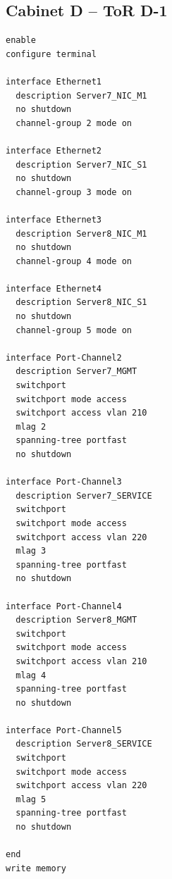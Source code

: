 \subsection{Cabinet D -- ToR D-1}
\begin{lstlisting}[caption={ToR D-1: downlinks to Servers 7 and 8 (DMZ).},basicstyle=\ttfamily\footnotesize,breaklines=true]
enable
configure terminal

interface Ethernet1
  description Server7_NIC_M1
  no shutdown
  channel-group 2 mode on

interface Ethernet2
  description Server7_NIC_S1
  no shutdown
  channel-group 3 mode on

interface Ethernet3
  description Server8_NIC_M1
  no shutdown
  channel-group 4 mode on

interface Ethernet4
  description Server8_NIC_S1
  no shutdown
  channel-group 5 mode on

interface Port-Channel2
  description Server7_MGMT
  switchport
  switchport mode access
  switchport access vlan 210
  mlag 2
  spanning-tree portfast
  no shutdown

interface Port-Channel3
  description Server7_SERVICE
  switchport
  switchport mode access
  switchport access vlan 220
  mlag 3
  spanning-tree portfast
  no shutdown

interface Port-Channel4
  description Server8_MGMT
  switchport
  switchport mode access
  switchport access vlan 210
  mlag 4
  spanning-tree portfast
  no shutdown

interface Port-Channel5
  description Server8_SERVICE
  switchport
  switchport mode access
  switchport access vlan 220
  mlag 5
  spanning-tree portfast
  no shutdown

end
write memory
\end{lstlisting}

